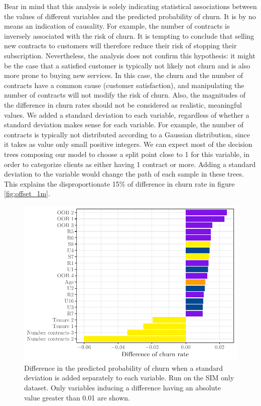 Bear in mind that this analysis is solely indicating statistical associations
between the values of different variables and the predicted probability of
churn. It is by no means an indication of causality. For example, the number of
contracts is inversely associated with the risk of churn. It is tempting to
conclude that selling new contracts to customers will therefore reduce their
risk of stopping their subscription. Nevertheless, the analysis does not confirm
this hypothesis: it might be the case that a satisfied customer is typically not
likely not churn and is also more prone to buying new services. In this case,
the churn and the number of contracts have a common cause (customer satisfaction),
and manipulating the number of contracts will not modify the risk of churn. Also,
the magnitudes of the difference in churn rates should not be considered as
realistic, meaningful values. We added a standard deviation to each variable,
regardless of whether a standard deviation makes sense for each variable. For
example, the number of contracts is typically not distributed according to a
Gaussian distribution, since it takes as value only small positive integers. We
can expect most of the decision trees composing our model to choose a split
point close to 1 for this variable, in order to categorize clients as either
having 1 contract or more. Adding a standard deviation to the variable would
change the path of each sample in these trees. This explains the
disproportionate 15\% of difference in churn rate in figure \ref{fig:offset_1m}.

\begin{figure}
    \centering
    \includegraphics[width=0.9\linewidth]{figures/offset_1p.pdf}
    \caption{Difference in the predicted probability of churn when a standard
    deviation is added separately to each variable. Run on the SIM only dataset.
    Only variables inducing a difference having an absolute value greater than
    0.01 are shown.}
    \label{fig:offset_1p}
\end{figure}

